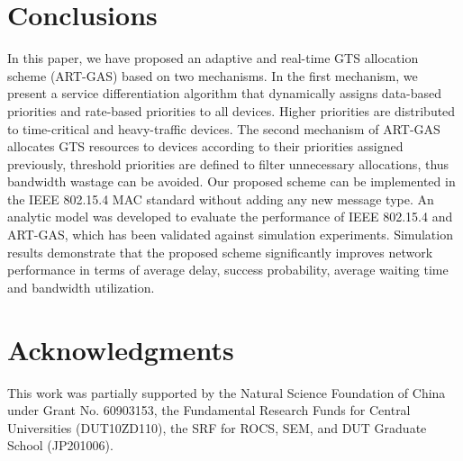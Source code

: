 \documentclass[letterpaper]{sig-alternate-10pt}
\begin{document}
\section{Conclusions}
In this paper, we have proposed an adaptive and real-time GTS allocation scheme (ART-GAS) based on two mechanisms. In the first mechanism, we present a service differentiation algorithm that dynamically assigns data-based priorities and rate-based priorities to all devices. Higher priorities are distributed to time-critical and heavy-traffic devices. The second mechanism of ART-GAS allocates GTS resources to devices according to their priorities assigned previously, threshold priorities are defined to filter unnecessary allocations, thus bandwidth wastage can be avoided. Our proposed scheme can be implemented in the IEEE 802.15.4 MAC standard without adding any new message type. An analytic model was developed to evaluate the performance of IEEE 802.15.4 and ART-GAS, which has been validated against simulation experiments. Simulation results demonstrate that the proposed scheme significantly improves network performance in terms of average delay, success probability, average waiting time and bandwidth utilization.


\section{Acknowledgments}
This work was partially supported by the Natural Science Foundation of China under Grant No. 60903153, the Fundamental Research Funds for Central Universities (DUT10ZD110), the SRF for ROCS, SEM, and DUT Graduate School (JP201006).
\end{document}
